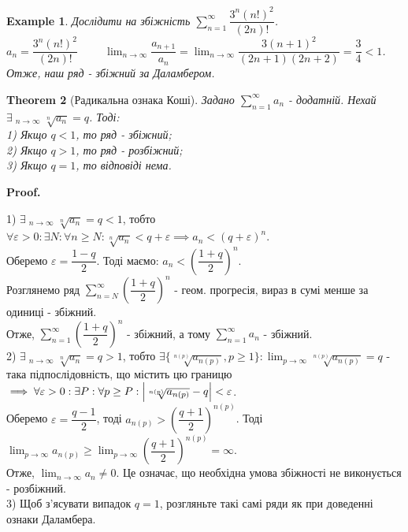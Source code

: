 \documentclass[a4paper, 10pt]{article}
\makeatletter
\DeclareMathOperator*\uplim{\overline{lim}}
\def\huge{\displaystyle}
\def\qed{$\blacksquare$}
\theoremstyle{theoremdd}
\newtheorem{theorem}{Theorem}[subsection]
\theoremstyle{theoremdd}
\theoremstyle{theoremdd}
\theoremstyle{theoremdd}
\newtheorem{example}[theorem]{Example}
\theoremstyle{theoremdd}
\theoremstyle{theoremdd}
\theoremstyle{theoremdd}
\theoremstyle{theoremdd}
\renewenvironment{proof}[1][Proof.\\]{\par
\pushQED{\hfill \qed}%
\normalfont \topsep6\p@\@plus6\p@\relax
\trivlist
\item\relax
{\bfseries
#1\@addpunct{.}}\hspace\labelsep\ignorespaces
}{%
\popQED\endtrivlist\@endpefalse
}
\makeatother
\begin{document}
\begin{example}
Дослідити на збіжність $\huge\sum_{n=1}^\infty \dfrac{3^n (n!)^2}{(2n)!}$.\\
$a_n = \dfrac{3^n (n!)^2}{(2n)!} \hspace{1cm} \huge\lim_{n \to \infty} \dfrac{a_{n+1}}{a_n} = \lim_{n \to \infty} \dfrac{3 (n+1)^2}{(2n+1)(2n+2)} = \dfrac{3}{4} < 1$.\\
Отже, наш ряд - збіжний за Даламбером.
\end{example}

\begin{theorem}[Радикальна ознака Коші]
Задано $\huge \sum_{n=1}^{\infty} a_n$ - додатній. Нехай $\exists \huge \uplim_{n \to \infty} \sqrt[n]{a_n} = q$. Тоді:\\
1) Якщо $q<1$, то ряд - збіжний;\\
2) Якщо $q>1$, то ряд - розбіжний;\\
3) Якщо $q=1$, то відповіді нема.
\end{theorem}

\begin{proof}
1) $\exists \huge \uplim_{n \to \infty} \sqrt[n]{a_n} = q < 1$, тобто $\forall \varepsilon > 0: \exists N: \forall n \geq N: \sqrt[n]{a_n} < q + \varepsilon \implies a_n < (q + \varepsilon)^n$.\\
Оберемо $\varepsilon = \dfrac{1-q}{2}$. Тоді маємо: $a_n < \left( \dfrac{1+q}{2} \right)^n$.\\
Розглянемо ряд $\huge \sum_{n = N}^{\infty} \left( \dfrac{1+q}{2} \right)^n$ - геом. прогресія, вираз в сумі менше за одиниці - збіжний.\\
Отже, $\huge \sum_{n = 1}^{\infty} \left( \dfrac{1+q}{2} \right)^n$ - збіжний, а тому $\huge \sum_{n=1}^{\infty} a_n$ - збіжний.
\bigskip \\
2) $\exists \huge \uplim_{n \to \infty} \sqrt[n]{a_n} = q > 1$, тобто $\exists \{\sqrt[n(p)]{a_{n(p)}}, p \geq 1 \}: \huge \lim_{p \to \infty} \sqrt[n(p)]{a_{n(p)}} = q$ - така підпослідовність, що містить цю границю $\implies \forall \varepsilon > 0: \exists P: \forall p \geq P: \abs{\sqrt[n(p)]{a_{n(p)}} - q} < \varepsilon$.\\
Оберемо $\varepsilon = \dfrac{q-1}{2}$, тоді $a_{n(p)} > \left( \dfrac{q+1}{2} \right)^{n(p)}$. Тоді $\huge \lim_{p \to \infty} a_{n(p)} \geq \lim_{p \to \infty} \left( \dfrac{q+1}{2} \right)^{n(p)} = \infty$.\\
Отже, $\huge \lim_{n \to \infty} a_n \neq 0$. Це означає, що необхідна умова збіжності не виконується - розбіжний.
\bigskip \\
3) Щоб з'ясувати випадок $q=1$, розгляньте такі самі ряди як при доведенні ознаки Даламбера.
\end{proof}
\end{document}
